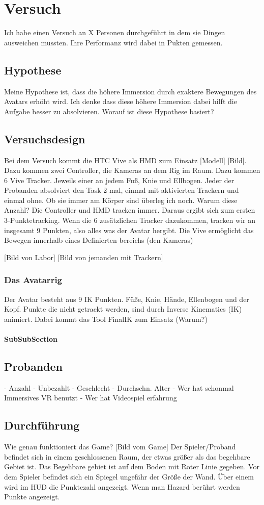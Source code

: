 \chapter{Versuch}

Ich habe einen Versuch an X Personen durchgeführt in dem sie Dingen ausweichen mussten. Ihre Performanz wird dabei in Pukten gemessen.

\section{Hypothese}
Meine Hypothese ist, dass die höhere Immersion durch exaktere Bewegungen des Avatars erhöht wird. Ich denke dass diese höhere Immersion dabei hilft die Aufgabe besser zu absolvieren.
Worauf ist diese Hypothese basiert?

\section{Versuchsdesign}
Bei dem Versuch kommt die HTC Vive als HMD zum Einsatz [Modell] [Bild]. Dazu kommen zwei Controller, die Kameras an dem Rig im Raum. Dazu kommen 6 Vive Tracker. Jeweils einer an jedem Fuß, Knie und Ellbogen.
Jeder der Probanden absolviert den Task 2 mal, einmal mit aktivierten Trackern und einmal ohne. Ob sie immer am Körper sind überleg ich noch.
Warum diese Anzahl?
Die Controller und HMD tracken immer. Daraus ergibt sich zum ersten 3-Punktetracking.
Wenn die 6 zusätzlichen Tracker dazukommen, tracken wir an insgesamt 9 Punkten, also alles was der Avatar hergibt.
Die Vive ermöglicht das Bewegen innerhalb eines Definierten bereichs (den Kameras)

[Bild von Labor] [Bild von jemanden mit Trackern]

 
\subsection{Das Avatarrig}
Der Avatar besteht aus 9 IK Punkten. Füße, Knie, Hände, Ellenbogen und der Kopf.
Punkte die nicht getrackt werden, sind durch Inverse Kinematics (IK) animiert. Dabei kommt das Tool FinalIK zum Einsatz (Warum?)
 
\subsubsection{SubSubSection}

\section{Probanden}
- Anzahl
- Unbezahlt
- Geschlecht
- Durchschn. Alter
- Wer hat schonmal Immersives VR benutzt
- Wer hat Videospiel erfahrung

\section{Durchführung}
Wie genau funktioniert das Game?
[Bild vom Game]
Der Spieler/Proband befindet sich in einem geschlossenen Raum, der etwas größer als das begehbare Gebiet ist. Das Begehbare gebiet ist auf dem Boden mit Roter Linie gegeben.
Vor dem Spieler befindet sich ein Spiegel ungefähr der Größe der Wand.
Über einem wird im HUD die Punktezahl angezeigt. Wenn man Hazard berührt werden Punkte angezeigt.